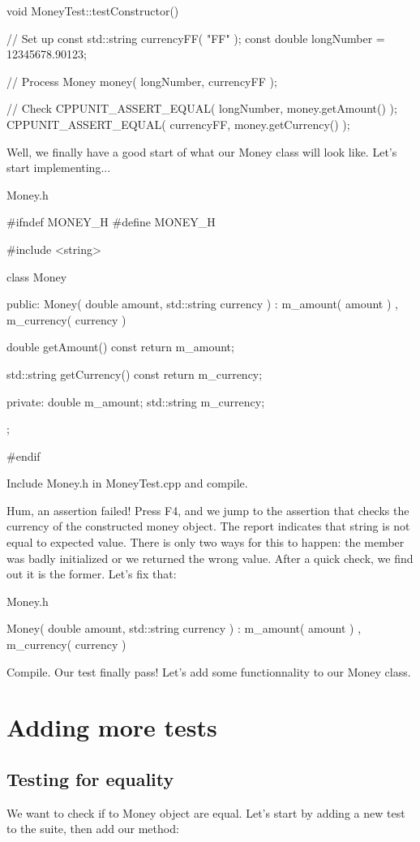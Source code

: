 \begin{DoxyCode}
void 
MoneyTest::testConstructor()
{
  // Set up
  const std::string currencyFF( "FF" );
  const double longNumber = 12345678.90123;

  // Process
  Money money( longNumber, currencyFF );

  // Check
  CPPUNIT_ASSERT_EQUAL( longNumber, money.getAmount() );
  CPPUNIT_ASSERT_EQUAL( currencyFF, money.getCurrency() );
}
\end{DoxyCode}


Well, we finally have a good start of what our Money class will look like. Let's start implementing...

{\ttfamily Money.h} 
\begin{DoxyCode}
#ifndef MONEY_H
#define MONEY_H

#include <string>

class Money
{
public:
  Money( double amount, std::string currency )
    : m_amount( amount )
    , m_currency( currency )
  {
  }

  double getAmount() const
  {
    return m_amount;
  }

  std::string getCurrency() const
  {
    return m_currency;
  }

private:
  double m_amount;
  std::string m_currency;
};

#endif
\end{DoxyCode}


Include {\ttfamily Money.h} in MoneyTest.cpp and compile.

Hum, an assertion failed! Press F4, and we jump to the assertion that checks the currency of the constructed money object. The report indicates that string is not equal to expected value. There is only two ways for this to happen: the member was badly initialized or we returned the wrong value. After a quick check, we find out it is the former. Let's fix that:

{\ttfamily Money.h} 
\begin{DoxyCode}
  Money( double amount, std::string currency )
    : m_amount( amount )
    , m_currency( currency )
  {
  }
\end{DoxyCode}


Compile. Our test finally pass! Let's add some functionnality to our Money class.\hypertarget{money_example_sec_more_tests}{}\section{Adding more tests}\label{money_example_sec_more_tests}
\hypertarget{money_example_sec_equal}{}\subsection{Testing for equality}\label{money_example_sec_equal}
We want to check if to Money object are equal. Let's start by adding a new test to the suite, then add our method:

